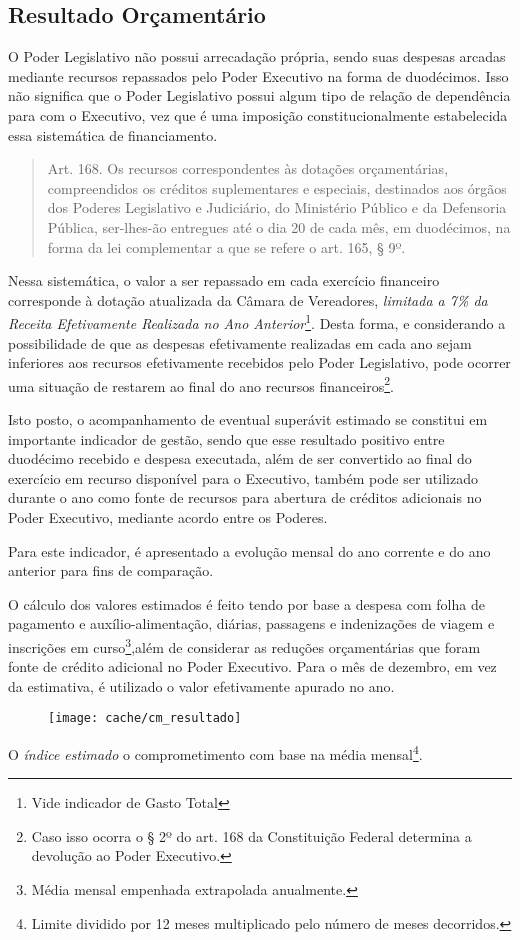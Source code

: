 
\subsection[Resultado Orçamentário]{Resultado Orçamentário}

O Poder Legislativo não possui arrecadação própria, sendo suas despesas arcadas mediante recursos repassados pelo Poder Executivo na forma de duodécimos. Isso não significa que o Poder Legislativo possui algum tipo de relação de dependência para com o Executivo, vez que é uma imposição constitucionalmente estabelecida essa sistemática de financiamento.

\begin{quotation}
Art. 168. Os recursos correspondentes às dotações orçamentárias, compreendidos os créditos suplementares e especiais, destinados aos órgãos dos Poderes Legislativo e Judiciário, do Ministério Público e da Defensoria Pública, ser-lhes-ão entregues até o dia 20 de cada mês, em duodécimos, na forma da lei complementar a que se refere o art. 165, § 9º.
\end{quotation}

Nessa sistemática, o valor a ser repassado em cada exercício financeiro corresponde à dotação atualizada da Câmara de Vereadores, \textit{limitada a 7\% da Receita Efetivamente Realizada no Ano Anterior}\footnote{Vide indicador de Gasto Total}. Desta forma, e considerando a possibilidade de que as despesas efetivamente realizadas em cada ano sejam inferiores aos recursos efetivamente recebidos pelo Poder Legislativo, pode ocorrer uma situação de restarem ao final do ano recursos financeiros\footnote{Caso isso ocorra o § 2º do art. 168 da Constituição Federal determina a devolução ao Poder Executivo.}. 

Isto posto, o acompanhamento de eventual superávit estimado se constitui em importante indicador de gestão, sendo que esse resultado positivo entre duodécimo recebido e despesa executada, além de ser convertido ao final do exercício em recurso disponível para o Executivo, também pode ser utilizado durante o ano como fonte de recursos para abertura de créditos adicionais no Poder Executivo, mediante acordo entre os Poderes.



Para este indicador, é apresentado a evolução mensal do ano corrente e do ano anterior para fins de comparação.

O cálculo dos valores estimados é feito tendo por base a despesa com folha de pagamento e auxílio-alimentação, diárias, passagens e indenizações de viagem e inscrições em curso\footnote{Média mensal empenhada extrapolada anualmente.},além de considerar as reduções orçamentárias que foram fonte de crédito adicional no Poder Executivo.
Para o mês de dezembro, em vez da estimativa, é utilizado o valor efetivamente apurado no ano.

\begin{figure}[H]
\center
\texttt{[image: cache/cm\_resultado]}
\end{figure}

O \textit{índice estimado} o comprometimento com base na média mensal\footnote{Limite dividido por 12 meses multiplicado pelo número de meses decorridos.}.